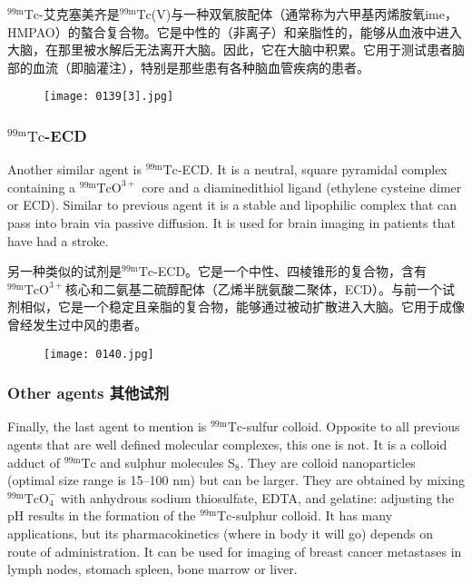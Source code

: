 \documentclass[dvipsnames, svgnames,a4paper,11pt]{article}
\begin{document}
${}^\mathrm{99m}\mathrm{Tc}$-艾克塞美齐是${}^\mathrm{99m}\mathrm{Tc}$(V)与一种双氧胺配体（通常称为六甲基丙烯胺氧ime，HMPAO）的螯合复合物。它是中性的（非离子）和亲脂性的，能够从血液中进入大脑，在那里被水解后无法离开大脑。因此，它在大脑中积累。它用于测试患者脑部的血流（即脑灌注），特别是那些患有各种脑血管疾病的患者。

\begin{figure}[h]
	\centering
    \texttt{[image: 0139[3].jpg]}    
     \label{fig146}
\end{figure}

\subsubsection{${}^\mathrm{99m}\mathrm{Tc}$-ECD}

Another similar agent is ${}^\mathrm{99m}\mathrm{Tc}$-ECD. It is a neutral, square pyramidal complex
containing a ${}^\mathrm{99m}\mathrm{TcO^{3+}}$ core and a diaminedithiol ligand (ethylene cysteine dimer or
ECD). Similar to previous agent it is a stable and lipophilic complex that can pass
into brain via passive diffusion. It is used for brain imaging in patients that have had
a stroke.

另一种类似的试剂是${}^\mathrm{99m}\mathrm{Tc}$-ECD。它是一个中性、四棱锥形的复合物，含有${}^\mathrm{99m}\mathrm{TcO^{3+}}$核心和二氨基二硫醇配体（乙烯半胱氨酸二聚体，ECD）。与前一个试剂相似，它是一个稳定且亲脂的复合物，能够通过被动扩散进入大脑。它用于成像曾经发生过中风的患者。

\begin{figure}[h]
	\centering
    \texttt{[image: 0140.jpg]}    
     \label{fig147}
\end{figure}


\subsubsection{Other agents 其他试剂}

Finally, the last agent to mention is ${}^\mathrm{99m}\mathrm{Tc}$-sulfur colloid. Opposite to all previous
agents that are well defined molecular complexes, this one is not. It is a colloid
adduct of ${}^\mathrm{99m}\mathrm{Tc}$ and sulphur molecules S${}_8$. They are colloid nanoparticles (optimal
size range is 15–100 nm) but can be larger. They are obtained by mixing ${}^\mathrm{99m}\mathrm{TcO_4^-}$
with anhydrous sodium thiosulfate, EDTA, and gelatine: adjusting the pH results in
the formation of the ${}^\mathrm{99m}\mathrm{Tc}$-sulphur colloid. It has many applications, but its
pharmacokinetics (where in body it will go) depends on route of administration. It can
be used for imaging of breast cancer metastases in lymph nodes, stomach spleen,
bone marrow or liver.
\end{document}
